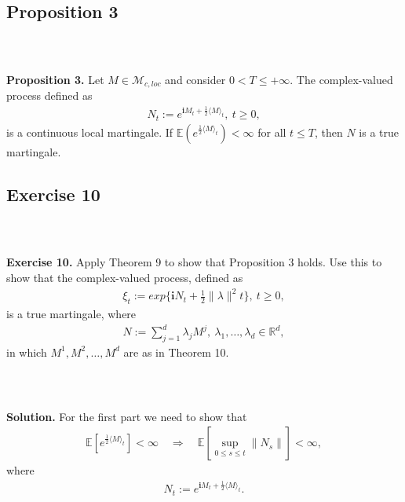 \documentclass{beamer}
\numberwithin{equation}{section}
\newenvironment{frame2}{\begin{frame}\frametitle{{\normalsize \secname} \\ {\large \subsecname}}}{\end{frame}}
\begin{document}
\subsection{Proposition 3}

\begin{frame2}
    \textbf{Proposition 3.}
    Let $M \in \mathcal{M}_{c,loc}$ and consider $0 < T \leq + \infty$.
    The complex-valued process defined as
    \begin{align}
        N_t := e^{\textbf{i}M_t + \frac{1}{2}\langle M \rangle_t}, \ t \geq 0,
    \end{align}
    is a continuous local martingale.
    If $\mathbb{E}\left(e^{\frac{1}{2}\langle M \rangle_t}\right) < \infty$ for all $t \leq T$, then $N$ is a true martingale.
\end{frame2}

\subsection{Exercise 10}

\begin{frame2}
    \textbf{Exercise 10.}
    Apply Theorem 9 to show that Proposition 3 holds.
    Use this to show that the complex-valued process, defined as
    \begin{align}
        \xi_t := exp\{ \textbf{i}N_t + \frac{1}{2}\| \lambda \|^2 t \}, \ t \geq 0,
    \end{align}
    is a true martingale, where
    \begin{align}
        N := \sum_{j = 1}^d \lambda_j M^j, \ \lambda_1,\ldots,\lambda_d \in \mathbb{R}^d,
    \end{align}
    in which $M^1, M^2, \ldots, M^d$ are as in Theorem 10.
\end{frame2}

\begin{frame2}
    \textbf{Solution.}
    For the first part we need to show that
    \begin{align}
        \mathbb{E}\left[e^{\frac{1}{2}\langle M \rangle_t}\right] < \infty \quad \Rightarrow \quad \mathbb{E}\left[\sup_{0 \leq s \leq t}\| N_s \|\right] < \infty,
    \end{align}
    where
    \begin{align}
        N_t := e^{\textbf{i}M_t + \frac{1}{2}\langle M \rangle_t}.
    \end{align}
\end{frame2}
\end{document}

